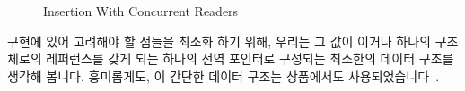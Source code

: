 \begin{figure}[tb]
\begin{center}
\end{center}
\caption{Insertion With Concurrent Readers}
\label{fig:defer:Insertion With Concurrent Readers}
\end{figure}

구현에 있어 고려해야 할 점들을 최소화 하기 위해, 우리는 그 값이 
이거나 하나의 구조체로의 레퍼런스를 갖게 되는 하나의 전역 포인터로 구성되는
최소한의 데이터 구조를 생각해 봅니다.
흥미롭게도, 이 간단한 데이터 구조는 상품에서도
사용되었습니다~\cite{GeoffRomer2018C++DeferredReclamationP0561R4}.

